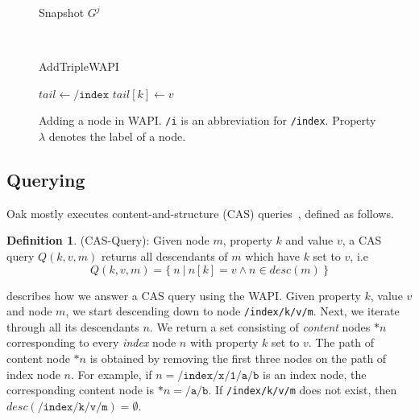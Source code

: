 \documentclass[abstracton,12pt]{scrartcl}
\theoremstyle{definition}
\newtheorem{definition}{Definition}
\begin{document}
\begin{figure}[h]
\begin{multicols}{2}
\begin{scriptsize}
\begin{multicols}{2}
\begin{center}
                        Snapshot $G^j$
                    \end{center}    
                \end{multicols}
            \end{scriptsize}
            \columnbreak
            ~

            \vspace{7.8mm}
            \begin{algorithm}[H]
                \label{algo:add_triple_wapi}
                \caption{AddTripleWAPI}
                \DontPrintSemicolon
                \begin{footnotesize}
                    \vspace{2.6mm}
                    $tail \longleftarrow \texttt{/index}$\;
                    $tail[k] \longleftarrow v$
                \end{footnotesize}
            \end{algorithm}
        \end{multicols}
    \vspace{-8mm}
    \caption{
        Adding a node in WAPI. \texttt{/i} is an abbreviation for \texttt{/index}.
        Property $\lambda$ denotes the label of a node.
    }
    \label{fig:add_wapi}
\end{figure}

\newpage

\subsection{Querying}

Oak mostly executes content-and-structure (CAS) queries~\cite{CM15}, defined as follows.

\begin{definition}
    (CAS-Query): Given node $m$, property $k$ and value $v$, a CAS query $Q(k,v,m)$ returns all descendants of $m$ which have $k$ set to $v$, i.e 
    $$ Q(k,v,m) = \{~n~|~n[k] = v \land n \in desc(m)~\}$$
\end{definition}

 describes how we answer a CAS query using the WAPI.
Given property $k$, value $v$ and node $m$, we start descending down to node \texttt{/index/k/v/m}.
Next, we iterate through all its descendants $n$.
We return a set consisting of \textit{content} nodes $*n$ corresponding to every \textit{index} node $n$ with property $k$ set to $v$.
The path of content node $*n$ is obtained by removing the first three nodes on the path of index node $n$.
For example, if $n = \texttt{/index/x/1/a/b}$ is an index node, the corresponding content node is $*n = \texttt{/a/b}$.
If \texttt{/index/k/v/m} does not exist, then $desc(\texttt{/index/k/v/m}) = \emptyset$.
\end{document}
